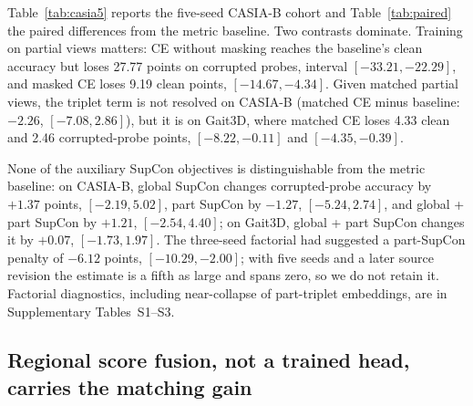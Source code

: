 \documentclass[review,12pt]{elsarticle}
\newcommand{\tablesetup}{\vspace{2pt}\footnotesize\renewcommand{\baselinestretch}{1.0}\selectfont\setlength{\tabcolsep}{3.5pt}}
\begin{document}
Table~\ref{tab:casia5} reports the five-seed CASIA-B cohort and
Table~\ref{tab:paired} the paired differences from the metric baseline. Two
contrasts dominate. Training on partial views matters: CE without masking
reaches the baseline's clean accuracy but loses 27.77 points on corrupted
probes, interval $[-33.21,-22.29]$, and masked CE loses 9.19 clean points,
$[-14.67,-4.34]$. Given matched partial views, the triplet term is not
resolved on CASIA-B (matched CE minus baseline: $-2.26$, $[-7.08,2.86]$), but it
is on Gait3D, where matched CE loses 4.33 clean and 2.46 corrupted-probe points,
$[-8.22,-0.11]$ and $[-4.35,-0.39]$.

None of the auxiliary SupCon objectives is distinguishable from the metric
baseline: on CASIA-B, global SupCon changes corrupted-probe accuracy by $+1.37$
points, $[-2.19,5.02]$, part SupCon by $-1.27$, $[-5.24,2.74]$, and global + part
SupCon by $+1.21$, $[-2.54,4.40]$; on Gait3D, global + part SupCon changes it by
$+0.07$, $[-1.73,1.97]$. The three-seed factorial had suggested a part-SupCon
penalty of $-6.12$ points, $[-10.29,-2.00]$; with five seeds and a later source
revision the estimate is a fifth as large and spans zero, so we do not retain it.
Factorial diagnostics, including near-collapse of part-triplet embeddings, are
in Supplementary Tables~S1--S3.

\begin{table}[!htbp]
\centering
\caption{CASIA-B development Rank-1 (\%), five training seeds per objective,
12 held-out identities and 792 probes. Clean and corrupted-probe columns give
mean $\pm$ seed standard deviation. Corrupted columns average four families at
severities 0.1--0.7; single-view averages NM, BG and CL.}
\label{tab:casia5}
{\tablesetup
}
\end{table}

\begin{table}[!htbp]
\centering
\caption{Paired Rank-1 difference from the metric baseline (percentage points;
crossed 95\% bootstrap interval over seeds and identities), global descriptor.
The three-seed column is the earlier factorial on CASIA-B; Gait3D uses its
300-identity development split. Dashes mark objectives absent from a cohort.
CE denotes cross-entropy.}
\label{tab:paired}
{\tablesetup
}
\end{table}

\subsection{Regional score fusion, not a trained head, carries the matching gain}
\end{document}
